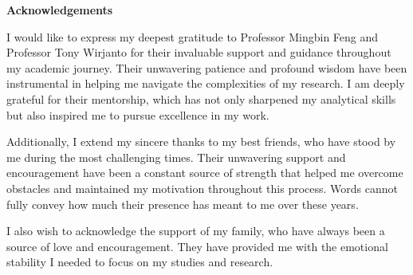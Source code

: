 \cleardoublepage


\begin{center}\textbf{Acknowledgements}\end{center}

I would like to express my deepest gratitude to Professor Mingbin Feng and Professor Tony Wirjanto for their invaluable support and guidance throughout my academic journey. 
Their unwavering patience and profound wisdom have been instrumental in helping me navigate the complexities of my research. 
I am deeply grateful for their mentorship, which has not only sharpened my analytical skills but also inspired me to pursue excellence in my work.

Additionally, I extend my sincere thanks to my best friends, who have stood by me during the most challenging times. 
Their unwavering support and encouragement have been a constant source of strength that helped me overcome obstacles and maintained my motivation throughout this process. 
Words cannot fully convey how much their presence has meant to me over these years.

I also wish to acknowledge the support of my family, who have always been a source of love and encouragement.
They have provided me with the emotional stability I needed to focus on my studies and research.

\cleardoublepage

\renewcommand\contentsname{Table of Contents}
\tableofcontents
\cleardoublepage
{}    %

\listoftables
\cleardoublepage
{}		%

\listoffigures
\cleardoublepage
{}		%

\printglossaries
\cleardoublepage
{}		%


